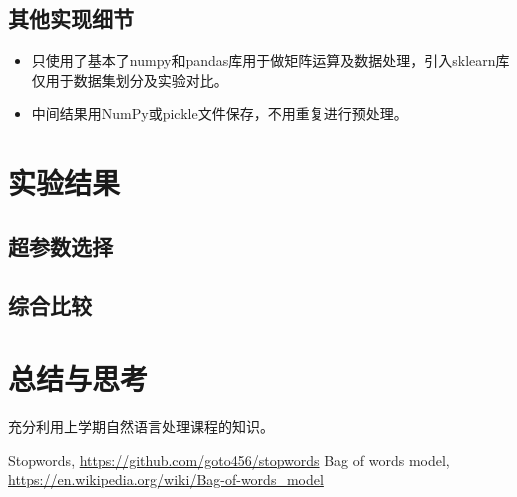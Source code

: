 \documentclass[logo,reportComp]{thesis}
\begin{document}
\subsection{其他实现细节}
\begin{itemize}
\item 只使用了基本了numpy和pandas库用于做矩阵运算及数据处理，引入sklearn库仅用于数据集划分及实验对比。
\item 中间结果用NumPy或pickle文件保存，不用重复进行预处理。
\end{itemize}

\section{实验结果}

\subsection{超参数选择}
\subsection{综合比较}
\section{总结与思考}
充分利用上学期自然语言处理课程的知识。

\begin{thebibliography}{99}
 Stopwords, \url{https://github.com/goto456/stopwords}
 Bag of words model, \url{https://en.wikipedia.org/wiki/Bag-of-words_model}
\end{thebibliography}
\end{document}
